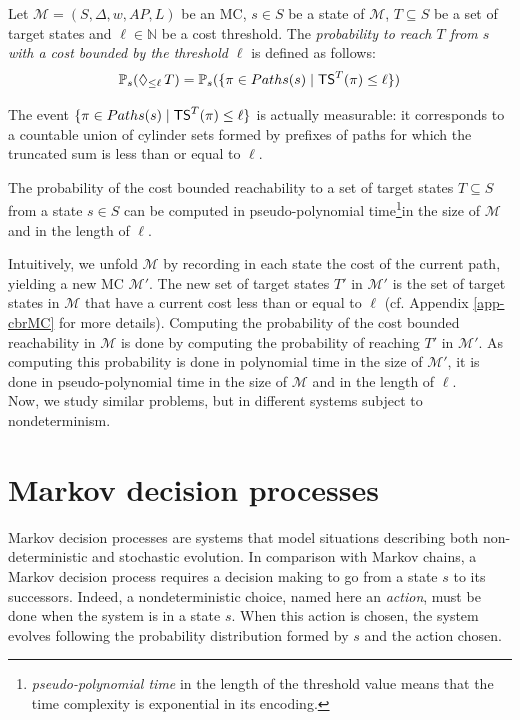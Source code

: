 \begin{definition}
	Let \sloppy $\mathcal{M} = (S, \Delta, w, AP, L)$ be an MC, $s \in S$ be a state of $\mathcal{M}$, $T \subseteq S$ be a set of target states and $\ell \in \mathbb{N}$ be a cost threshold.
  The \textit{probability to reach $T$ from $s$ with a cost bounded by the threshold $\ell$} is defined as follows:
	\[
    \mathbb{P}_s(\Diamond_{\leq \ell}\, T) = \mathbb{P}_s(\{\pi \in Paths(s) \; | \; \text{\sffamily TS}^T(\pi) \leq \ell \})
  \]
\end{definition}
The event $\{\pi \in Paths(s) \; | \; \text{\sffamily TS}^T(\pi) \leq \ell \}$ is actually measurable: it corresponds to a countable union of cylinder sets formed by prefixes of paths for which the truncated sum is less than or equal to $\ell$.%
\begin{theorem} \label{cost-bounded-thm}
  The probability of the cost bounded reachability to a set of target states $T \subseteq S$ from a state $s \in S$ can be computed in pseudo-polynomial time\footnote{\textit{pseudo-polynomial time} in the length of the threshold value means that the time complexity is exponential in its encoding.}in the size of $\mathcal{M}$ and in the length of $\ell$.
\end{theorem}

Intuitively, we unfold $\mathcal{M}$ by recording in each state the cost of the
current path, yielding a new MC $\mathcal{M}'$. The new set of target states $T'$ in $\mathcal{M}'$ is the set of
target states in $\mathcal{M}$ that have a current cost less than or equal to $\ell$ (cf.
Appendix \ref{app-cbrMC} for more details).
Computing the probability of the cost bounded reachability in $\mathcal{M}$ is done by computing the probability of reaching $T'$ in $\mathcal{M}'$.
As computing this probability is done in polynomial time in the size of $\mathcal{M}'$, it is done in pseudo-polynomial time in the size of $\mathcal{M}$ and in the length of $\ell$.
\\

Now, we study similar problems, but in different systems subject to nondeterminism.

\section{Markov decision processes}
Markov decision processes are systems that model situations describing both non-deterministic and stochastic evolution.
In comparison with Markov chains, a Markov decision process requires a decision making to go from a state $s$ to its successors.
Indeed, a nondeterministic choice, named here an \textit{action}, must be done when the system is in a state $s$.
When this action is chosen, the system evolves following the probability distribution formed by $s$ and the action chosen.

